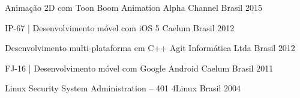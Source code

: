 

\begin{cventries}


  \cventry
    {Animação 2D com Toon Boom Animation} %
    {Alpha Channel} %
    {Brasil} %
    {2015} %
    {}

  \cventry
    {IP-67 | Desenvolvimento móvel com iOS 5} %
    {Caelum} %
    {Brasil} %
    {2012} %
    {}


  \cventry
    {Desenvolvimento multi-plataforma em C++} %
    {Agit Informática Ltda} %
    {Brasil} %
    {2012} %
    {}

  \cventry
    {FJ-16 | Desenvolvimento móvel com Google Android} %
    {Caelum} %
    {Brasil} %
    {2011} %
    {
    }

  \cventry
    {Linux Security System Administration – 401} %
    {4Linux} %
    {Brasil} %
    {2004} %
    {}


\end{cventries}
